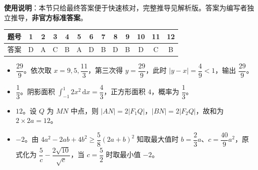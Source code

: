 
\begin{gknotice}
\textbf{使用说明}：本节只给最终答案便于快速核对，完整推导见解析版。答案为编写者独立推导，\textbf{非官方标准答案}。
\end{gknotice}

\begin{center}\begin{tabular}{ccccccccccccc}
\toprule
题号 & 1 & 2 & 3 & 4 & 5 & 6 & 7 & 8 & 9 & 10 & 11 & 12 \\
\midrule
答案 & D & A & C & B & A & D & B & D & B & D & C & B \\
\bottomrule
\end{tabular}\end{center}

\begin{itemize}[leftmargin=2.6em]
  \item[\textbf{13.}] $\dfrac{29}9$。依次取 $x=9,5,\dfrac{11}3$，第三次得 $y=\dfrac{29}9$，此时 $|y-x|=\dfrac49<1$，输出 $\dfrac{29}9$。
  \item[\textbf{14.}] $\dfrac13$。阴影面积 $\displaystyle\int_{-1}^{1}2x^2\,\mathrm dx=\dfrac43$，正方形面积 $4$，概率为 $\dfrac13$。
  \item[\textbf{15.}] $12$。设 $Q$ 为 $MN$ 中点，则 $|AN|=2|F_1Q|$，$|BN|=2|F_2Q|$，故和为 $2\times2a=12$。
  \item[\textbf{16.}] $-2$。由 $4a^2-2ab+4b^2\geqslant\dfrac58(2a+b)^2$ 知取最大值时 $b=\dfrac23a$、$c=\dfrac{40}9a^2$，原式化为 $\dfrac5c-\dfrac{2\sqrt{10}}{\sqrt c}$，当 $c=\dfrac52$ 时取最小值 $-2$。
\end{itemize}

